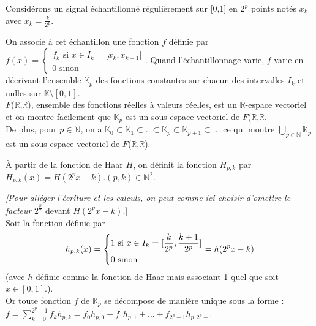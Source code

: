 \documentclass{article}
\begin{document}
Considérons un signal échantillonné régulièrement sur [0,1] en $2^p$ points notés $x_{k}$ avec $x_{k} = \frac{k}{2^p}$.

On associe à cet échantillon une fonction $f$ définie par $f(x) = \begin{cases}
     f_{k} \text{ si } x \in I_{k} = [x_{k},x_{k+1}[\\
     0 \text{ sinon }
   \end{cases}$.
Quand l'échantillonnage varie, $f$ varie en décrivant l'ensemble $\mathbb{K}_{p}$ des fonctions constantes sur chacun des intervalles $I_{k}$ et nulles sur $\mathbb{K} \setminus [0,1]$. \\

$F$($\mathbb{R}$,$\mathbb{R}$), ensemble des fonctions réelles à valeurs réelles, est un $\mathbb{R}$-espace vectoriel et on montre facilement que $\mathbb{K}_{p}$ est un sous-espace vectoriel de $F$($\mathbb{R}$,$\mathbb{R}$. \\

De plus, pour $p \in \mathbb{N}$, on a $\mathbb{K}_{0} \subset \mathbb{K}_{1} \subset .. \subset \mathbb{K}_{p} \subset \mathbb{K}_{p+1} \subset ... $ ce qui montre $\bigcup\limits_{p \in \mathbb{N}}\mathbb{K}_{p}$ est un sous-espace vectoriel de $F$($\mathbb{R}$,$\mathbb{R}$).

\uppercase{à} partir de la fonction de Haar $H$, on définit la fonction $H_{p,k}$ par $H_{p,k}(x) = H(2^{p}x - k). (p,k) \in \mathbb{N}^2$.

\textit{[Pour alléger l’écriture et les calculs, on peut comme ici choisir d’omettre le facteur }$2^\frac{p}{2}$ devant $ H(2^{p}x - k)$.] \\

Soit la fonction définie par \[
 h_{p,k}(x) = \begin{dcases*}
        1 \text{ si } x \in I_{k} = [\frac{k}{2^p},\frac{k+1}{2^p}] \\ 
        0 \text{ sinon }
        \end{dcases*}
 = h(2^{p}x - k) \] (avec $h$ définie comme la fonction de Haar mais associant 1 quel que soit $x \in [0,1]$.). \\

Or toute fonction $f$ de $\mathbb{K}_{p}$ se décompose de manière unique sous la forme : \\

$\displaystyle f = \sum_{k = 0}^{2^p - 1} f_{k}h_{p,k} = f_{0}h_{p,0} + f_{1}h_{p,1} + ... + f_{2^p - 1}h_{p,2^p - 1}$ \\
\end{document}
